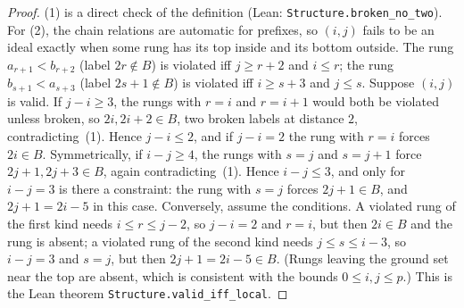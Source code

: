 \documentclass[11pt]{amsart}
\theoremstyle{definition}
\theoremstyle{remark}
\begin{document}
\begin{proof}
(1) is a direct check of the definition (Lean: \texttt{Structure.broken\_no\_two}). For (2), the chain relations are automatic for prefixes, so $(i,j)$ fails to be an ideal exactly when some rung has its top inside and its bottom outside. The rung $a_{r+1}<b_{r+2}$ (label $2r\notin B$) is violated iff $j\ge r+2$ and $i\le r$; the rung $b_{s+1}<a_{s+3}$ (label $2s+1\notin B$) is violated iff $i\ge s+3$ and $j\le s$. Suppose $(i,j)$ is valid. If $j-i\ge3$, the rungs with $r=i$ and $r=i+1$ would both be violated unless broken, so $2i,2i+2\in B$, two broken labels at distance $2$, contradicting~(1). Hence $j-i\le2$, and if $j-i=2$ the rung with $r=i$ forces $2i\in B$. Symmetrically, if $i-j\ge4$, the rungs with $s=j$ and $s=j+1$ force $2j+1,2j+3\in B$, again contradicting~(1). Hence $i-j\le3$, and only for $i-j=3$ is there a constraint: the rung with $s=j$ forces $2j+1\in B$, and $2j+1=2i-5$ in this case. Conversely, assume the conditions. A violated rung of the first kind needs $i\le r\le j-2$, so $j-i=2$ and $r=i$, but then $2i\in B$ and the rung is absent; a violated rung of the second kind needs $j\le s\le i-3$, so $i-j=3$ and $s=j$, but then $2j+1=2i-5\in B$. (Rungs leaving the ground set near the top are absent, which is consistent with the bounds $0\le i,j\le p$.) This is the Lean theorem \texttt{Structure.valid\_iff\_local}.


\end{proof}
\end{document}
